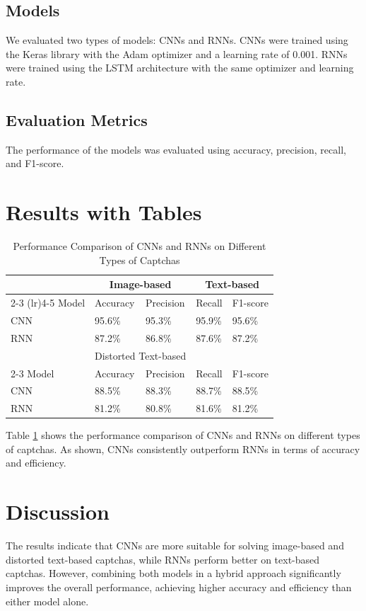 \documentclass{article}
\begin{document}
\subsection{Models}
We evaluated two types of models: CNNs and RNNs. CNNs were trained using the Keras library with the Adam optimizer and a learning rate of 0.001. RNNs were trained using the LSTM architecture with the same optimizer and learning rate.

\subsection{Evaluation Metrics}
The performance of the models was evaluated using accuracy, precision, recall, and F1-score.

\section{Results with Tables}
\begin{table}[ht]
    \centering
    \caption{Performance Comparison of CNNs and RNNs on Different Types of Captchas}
    \begin{tabular}{@{}lllll@{}}
        \toprule
        & \multicolumn{2}{c}{Image-based} & \multicolumn{2}{c}{Text-based} \\
        \cmidrule(lr){2-3} \cmidrule(lr){4-5}
        Model & Accuracy & Precision & Recall & F1-score \\
        \midrule
        CNN & 95.6\% & 95.3\% & 95.9\% & 95.6\% \\
        RNN & 87.2\% & 86.8\% & 87.6\% & 87.2\% \\
        \midrule
        & \multicolumn{2}{c}{Distorted Text-based} \\
        \cmidrule(lr){2-3}
        Model & Accuracy & Precision & Recall & F1-score \\
        \midrule
        CNN & 88.5\% & 88.3\% & 88.7\% & 88.5\% \\
        RNN & 81.2\% & 80.8\% & 81.6\% & 81.2\% \\
        \bottomrule
    \end{tabular}
    \label{tab:results}
\end{table}

Table \ref{tab:results} shows the performance comparison of CNNs and RNNs on different types of captchas. As shown, CNNs consistently outperform RNNs in terms of accuracy and efficiency.

\section{Discussion}
The results indicate that CNNs are more suitable for solving image-based and distorted text-based captchas, while RNNs perform better on text-based captchas. However, combining both models in a hybrid approach significantly improves the overall performance, achieving higher accuracy and efficiency than either model alone.
\end{document}
